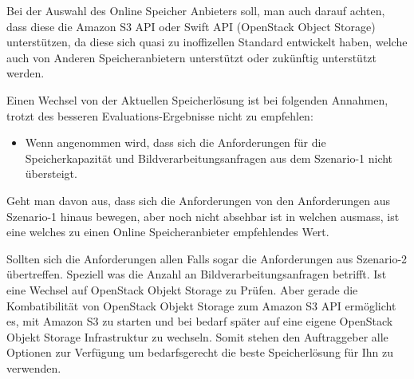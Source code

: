 Bei der Auswahl des Online Speicher Anbieters soll, man auch darauf achten, dass diese die Amazon S3 API oder Swift API (OpenStack Object Storage) unterstützen, da diese sich quasi zu inoffizellen Standard entwickelt haben, welche auch von Anderen Speicheranbietern unterstützt oder zukünftig unterstützt werden.
 
Einen Wechsel von der Aktuellen Speicherlösung ist bei folgenden Annahmen, trotzt des besseren Evaluations-Ergebnisse nicht zu empfehlen:

\begin{itemize}
\item Wenn angenommen wird, dass sich die Anforderungen für die Speicherkapazität und Bildverarbeitungsanfragen aus dem Szenario-1 nicht übersteigt.
\end{itemize}

Geht man davon aus, dass sich die Anforderungen von den Anforderungen aus Szenario-1 hinaus bewegen, aber noch nicht absehbar ist in welchen ausmass, ist eine welches zu einen Online Speicheranbieter empfehlendes Wert.

Sollten sich die Anforderungen allen Falls sogar die Anforderungen aus Szenario-2 übertreffen. Speziell was die Anzahl an Bildverarbeitungsanfragen betrifft. Ist eine Wechsel auf OpenStack Objekt Storage zu Prüfen. Aber gerade die Kombatibilität von OpenStack Objekt Storage zum Amazon S3 API ermöglicht es, mit Amazon S3 zu starten und bei bedarf später auf eine eigene OpenStack Objekt Storage Infrastruktur zu wechseln. Somit stehen den Auftraggeber alle Optionen zur Verfügung um bedarfsgerecht die beste Speicherlösung für Ihn zu verwenden.

